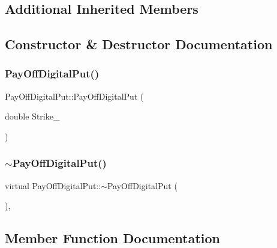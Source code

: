 \subsection*{Additional Inherited Members}


\subsection{Constructor \& Destructor Documentation}
\hypertarget{classPayOffDigitalPut_a4c74bd1cce25134ccccffa87005aeda3}{}\label{classPayOffDigitalPut_a4c74bd1cce25134ccccffa87005aeda3} 
\subsubsection{\texorpdfstring{Pay\+Off\+Digital\+Put()}{PayOffDigitalPut()}}
{\footnotesize\ttfamily Pay\+Off\+Digital\+Put\+::\+Pay\+Off\+Digital\+Put (\begin{DoxyParamCaption}\item[{double}]{Strike\+\_\+ }\end{DoxyParamCaption})}

\hypertarget{classPayOffDigitalPut_a9ee0c37179c251132f21143b59e618bb}{}\label{classPayOffDigitalPut_a9ee0c37179c251132f21143b59e618bb} 
\subsubsection{\texorpdfstring{$\sim$\+Pay\+Off\+Digital\+Put()}{~PayOffDigitalPut()}}
{\footnotesize\ttfamily virtual Pay\+Off\+Digital\+Put\+::$\sim$\+Pay\+Off\+Digital\+Put (\begin{DoxyParamCaption}{ }\end{DoxyParamCaption})\hspace{0.3cm}{\ttfamily [inline]}, {\ttfamily [virtual]}}



\subsection{Member Function Documentation}
\hypertarget{classPayOffDigitalPut_a5c3b4ad40c3cc3c6a1c9711963fa5126}{}\label{classPayOffDigitalPut_a5c3b4ad40c3cc3c6a1c9711963fa5126} 
